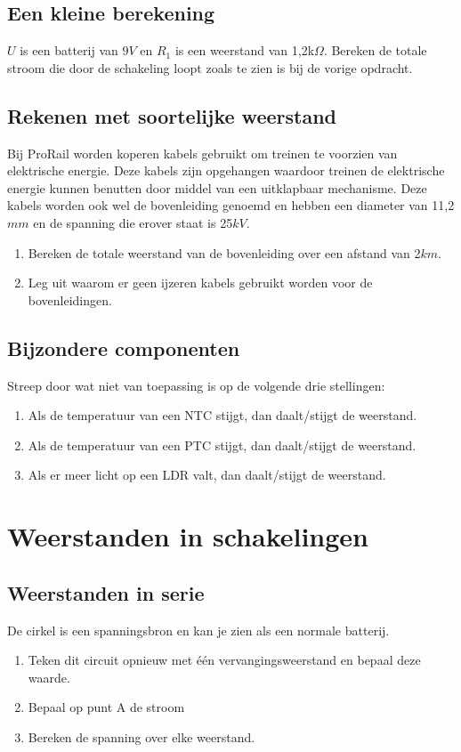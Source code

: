 \documentclass[11pt]{article}
\begin{document}
\subsection{Een kleine berekening}
$U$ is een batterij van $9V$ en $R_1$ is een weerstand van 1,2k$\Omega$. Bereken de totale stroom die door de schakeling loopt zoals te zien is bij de vorige opdracht.

\subsection{Rekenen met soortelijke weerstand}
Bij ProRail worden koperen kabels gebruikt om treinen te voorzien van elektrische energie. Deze kabels zijn opgehangen waardoor treinen de elektrische energie kunnen benutten door middel van een uitklapbaar mechanisme. Deze kabels worden ook wel de bovenleiding genoemd en hebben een diameter van 11,2 $mm$ en de spanning die erover staat is 25$kV$. 
\begin{enumerate}
 \item Bereken de totale weerstand van de bovenleiding over een afstand van 2$km$.
 \item Leg uit waarom er geen ijzeren kabels gebruikt worden voor de bovenleidingen.
\end{enumerate}
\subsection{Bijzondere componenten}
Streep door wat niet van toepassing is op de volgende drie stellingen:
\begin{enumerate}
    \item Als de temperatuur van een NTC stijgt, dan daalt/stijgt de weerstand.
    \item Als de temperatuur van een PTC stijgt, dan daalt/stijgt de weerstand.
    \item Als er meer licht op een LDR valt, dan daalt/stijgt de weerstand.
\end{enumerate}
\section{Weerstanden in schakelingen}
\subsection{Weerstanden in serie}
De cirkel is een spanningsbron en kan je zien als een normale batterij. 
\begin{enumerate}
\item Teken dit circuit opnieuw met één vervangingsweerstand en bepaal deze waarde.
\item Bepaal op punt A de stroom
\item Bereken de spanning over elke weerstand.
\end{enumerate}
\end{document}
